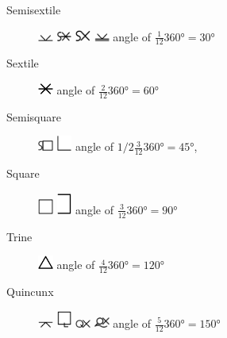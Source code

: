 \documentclass[british,final,landscape]{scrartcl}
\begin{document}
\begin{refsection}
\begin{description}
{\begin{description}
      \end{description} }
   \item[Semisextile]{\includegraphics[width=5mm]{Astrology/Semisextile} \includegraphics[width=5mm]{Astrology/Semisextile2} \includegraphics[width=5mm]{Astrology/Semisextile3} \includegraphics[width=5mm]{Astrology/Semisextile4} angle of \(\frac{1}{12} \ang{360} = \ang{30}\) }
   \item[Sextile]{\includegraphics[width=5mm]{Astrology/Sextile} angle of \(\frac{2}{12} \ang{360} = \ang{60}\) }
   \item[Semisquare]{\includegraphics[width=5mm]{Astrology/SemiSquare} \includegraphics[width=5mm]{Astrology/SemiSquare2} angle of \(1/2 \frac{3}{12} \ang{360} = \ang{45}\),  }
   \item[Square]{\includegraphics[width=5mm]{Astrology/Square} \includegraphics[width=5mm]{Astrology/Square2} angle of \(\frac{3}{12} \ang{360} = \ang{90}\) }
   \item[Trine]{\includegraphics[width=5mm]{Astrology/Trine} angle of \(\frac{4}{12} \ang{360} = \ang{120}\) }
   \item[Quincunx]{\includegraphics[width=5mm]{Astrology/Quincunx} \includegraphics[width=5mm]{Astrology/Quincunx2} \includegraphics[width=5mm]{Astrology/Quincunx3} \includegraphics[width=5mm]{Astrology/Quincunx4} angle of \(\frac{5}{12} \ang{360} = \ang{150}\) }

\end{description}
\end{refsection}
\end{document}
